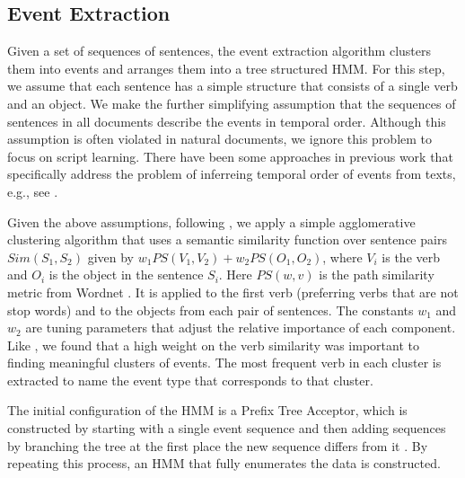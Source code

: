 \documentclass[letterpaper]{article}
\begin{document}
\subsection{Event Extraction}

Given a set of sequences of sentences, the event extraction algorithm clusters them into events and arranges them into a tree structured HMM. For this step, we assume that each sentence has a simple structure that consists of a single verb and an object. We make the further simplifying assumption that the sequences of sentences in all documents describe the events in temporal order. Although this assumption is often violated in natural documents, we ignore this problem to focus on script learning. There have been some approaches in previous work that specifically address the problem of inferreing temporal order of events from texts, e.g., see \cite{Raghavan:temporal}.


Given the above assumptions, following \cite{regneri2010learning}, we apply a simple agglomerative clustering algorithm that uses a semantic similarity function over sentence pairs  $Sim(S_1, S_2)$ given by $w_1 PS(V_1, V_2) + w_2 PS(O_1, O_2)$, where $V_i$ is the verb and $O_i$ is the object in the sentence $S_i$. Here $PS(w, v)$ is the path similarity metric from Wordnet \cite{miller1995wordnet}. It is applied to the first verb (preferring verbs that are not stop words) and to the objects from each pair of sentences.  The constants $w_1$ and $w_2$ are tuning parameters that adjust the relative importance of each component. Like \cite{regneri2010learning}, we found that a high weight on the verb similarity was important to finding meaningful clusters of events.  %
The most frequent verb in each cluster is extracted to name the event type that corresponds to that cluster.

The initial configuration of the HMM is a Prefix Tree Acceptor,
which is constructed by starting with a single event
sequence and then adding sequences by branching the tree
at the first place the new sequence differs from it
\cite{dupont1994search,seymore1999learning}.   %
By repeating this process, an HMM that fully enumerates the data is
constructed.  %
\end{document}
